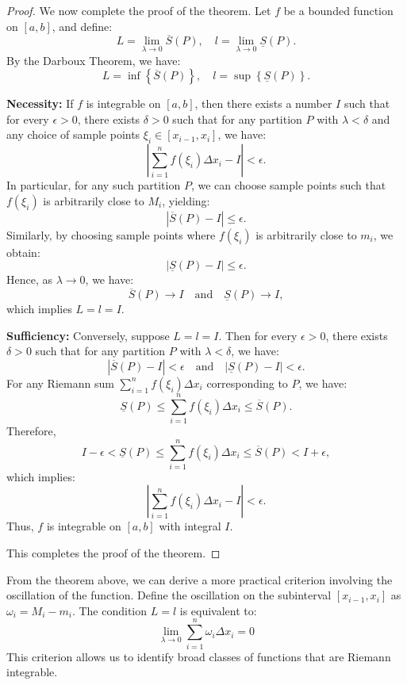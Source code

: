 \begin{proof}
We now complete the proof of the theorem. Let \( f \) be a bounded function on \([a,b]\), and define:
\[
L = \lim_{\lambda \to 0} \overline{S}(P), \quad l = \lim_{\lambda \to 0} \underline{S}(P).
\]
By the Darboux Theorem, we have:
\[
L = \inf \left\{ \overline{S}(P) \right\}, \quad l = \sup \left\{ \underline{S}(P) \right\}.
\]

\noindent \textbf{Necessity:} If \( f \) is integrable on \([a,b]\), then there exists a number \( I \) such that for every \( \epsilon > 0 \), there exists \( \delta > 0 \) such that for any partition \( P \) with \( \lambda < \delta \) and any choice of sample points \( \xi_i \in [x_{i-1}, x_i] \), we have:
\[
\left| \sum_{i=1}^{n} f(\xi_i) \Delta x_i - I \right| < \epsilon.
\]
In particular, for any such partition \( P \), we can choose sample points such that \( f(\xi_i) \) is arbitrarily close to \( M_i \), yielding:
\[
\left| \overline{S}(P) - I \right| \leq \epsilon.
\]
Similarly, by choosing sample points where \( f(\xi_i) \) is arbitrarily close to \( m_i \), we obtain:
\[
\left| \underline{S}(P) - I \right| \leq \epsilon.
\]
Hence, as \( \lambda \to 0 \), we have:
\[
\overline{S}(P) \to I \quad \text{and} \quad \underline{S}(P) \to I,
\]
which implies \( L = l = I \).

\noindent \textbf{Sufficiency:} Conversely, suppose \( L = l = I \). Then for every \( \epsilon > 0 \), there exists \( \delta > 0 \) such that for any partition \( P \) with \( \lambda < \delta \), we have:
\[
\left| \overline{S}(P) - I \right| < \epsilon \quad \text{and} \quad \left| \underline{S}(P) - I \right| < \epsilon.
\]
For any Riemann sum \( \sum_{i=1}^{n} f(\xi_i) \Delta x_i \) corresponding to \( P \), we have:
\[
\underline{S}(P) \leq \sum_{i=1}^{n} f(\xi_i) \Delta x_i \leq \overline{S}(P).
\]
Therefore,
\[
I - \epsilon < \underline{S}(P) \leq \sum_{i=1}^{n} f(\xi_i) \Delta x_i \leq \overline{S}(P) < I + \epsilon,
\]
which implies:
\[
\left| \sum_{i=1}^{n} f(\xi_i) \Delta x_i - I \right| < \epsilon.
\]
Thus, \( f \) is integrable on \([a,b]\) with integral \( I \).

This completes the proof of the theorem.
\end{proof}

From the theorem above, we can derive a more practical criterion involving the oscillation of the function. Define the oscillation on the subinterval $[x_{i-1}, x_i]$ as $\omega_i = M_i - m_i$. The condition $L=l$ is equivalent to:
\[
\lim_{\lambda \to 0} \sum_{i=1}^n \omega_i \Delta x_i = 0
\]
This criterion allows us to identify broad classes of functions that are Riemann integrable.

